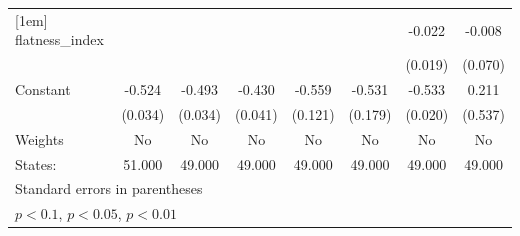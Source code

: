 {\begin{tabular}{l*{7}{c}}
[1em]
flatness\_index&                     &                     &                     &                     &                     &      -0.022         &      -0.008         \\
            &                     &                     &                     &                     &                     &     (0.019)         &     (0.070)         \\
[1em]
Constant    &      -0.524\sym{***}&      -0.493\sym{***}&      -0.430\sym{***}&      -0.559\sym{***}&      -0.531\sym{***}&      -0.533\sym{***}&       0.211         \\
            &     (0.034)         &     (0.034)         &     (0.041)         &     (0.121)         &     (0.179)         &     (0.020)         &     (0.537)         \\
\hline
Weights     &          No         &          No         &          No         &          No         &          No         &          No         &          No         \\
States:     &      51.000         &      49.000         &      49.000         &      49.000         &      49.000         &      49.000         &      49.000         \\
\hline\hline
\multicolumn{8}{l}{\footnotesize Standard errors in parentheses}\\
\multicolumn{8}{l}{\footnotesize \sym{*} \(p<0.1\), \sym{**} \(p<0.05\), \sym{***} \(p<0.01\)}\\
\end{tabular}
}
